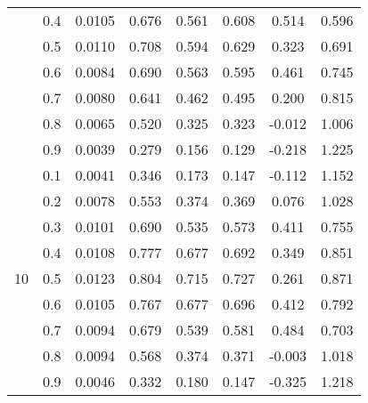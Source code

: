 \documentclass[11pt,a4paper]{report}
\begin{document}
\begin{longtable}{ | c | c || c | c | c | c | c | c | }
 & 0.4 & 0.0105 & 0.676 & 0.561 & 0.608 & 0.514 & 0.596 \\
 & 0.5 & 0.0110 & 0.708 & 0.594 & 0.629 & 0.323 & 0.691 \\
 & 0.6 & 0.0084 & 0.690 & 0.563 & 0.595 & 0.461 & 0.745 \\
 & 0.7 & 0.0080 & 0.641 & 0.462 & 0.495 & 0.200 & 0.815 \\
 & 0.8 & 0.0065 & 0.520 & 0.325 & 0.323 & -0.012 & 1.006 \\
 & 0.9 & 0.0039 & 0.279 & 0.156 & 0.129 & -0.218 & 1.225 \\
 \hline
\multirow{9}{*}{10} & 0.1 & 0.0041 & 0.346 & 0.173 & 0.147 & -0.112 & 1.152 \\
 & 0.2 & 0.0078 & 0.553 & 0.374 & 0.369 & 0.076 & 1.028 \\
 & 0.3 & 0.0101 & 0.690 & 0.535 & 0.573 & 0.411 & 0.755 \\
 & 0.4 & 0.0108 & 0.777 & 0.677 & 0.692 & 0.349 & 0.851 \\
 & 0.5 & 0.0123 & 0.804 & 0.715 & 0.727 & 0.261 & 0.871 \\
 & 0.6 & 0.0105 & 0.767 & 0.677 & 0.696 & 0.412 & 0.792 \\
 & 0.7 & 0.0094 & 0.679 & 0.539 & 0.581 & 0.484 & 0.703 \\
 & 0.8 & 0.0094 & 0.568 & 0.374 & 0.371 & -0.003 & 1.018 \\
 & 0.9 & 0.0046 & 0.332 & 0.180 & 0.147 & -0.325 & 1.218 \\
 \hline
\hline
\end{longtable}
\end{document}
